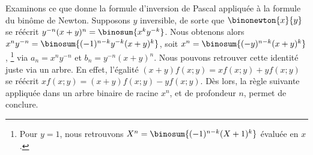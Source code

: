\begin{remark}
    Examinons ce que donne la formule d'inversion de Pascal appliquée à la formule du binôme de Newton.
    Supposons $y$ inversible, de sorte que $\binonewton{x}{y}$ se réécrit $y^{-n}(x+y)^n = \binosum{x^k y^{-k}}$.
    Nous obtenons alors $x^n y^{-n} = \binosum{(-1)^{n-k} y^{-k} (x+y)^k}$,
    soit $x^n = \binosum{(- y)^{n-k} (x+y)^k}$,%
    \footnote{
        Pour $y = 1$, nous retrouvons
        $X^n = \binosum{(-1)^{n-k} (X+1)^k}$
        évaluée en $x$.
    }
    via
    $a_ n = x^n y^{-n}$
    et
    $b_ n = y^{-n}(x+y)^n$.
    Nous pouvons retrouver cette identité juste via un arbre.
    En effet,
    l'égalité
    $(x + y)f(x ; y) = x f(x ; y) + y f(x ; y)$ se réécrit $x f(x ; y) = (x + y)f(x ; y) - y f(x ; y)$.
    Dès lors,
    la règle suivante appliquée dans un arbre binaire de racine $x^n$, et de profondeur $n$, permet de conclure.

                {\intertree}{}
\end{remark}
